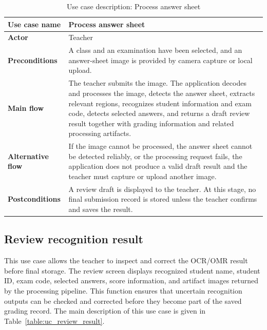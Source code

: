 \documentclass[../Main.tex]{subfiles}
\begin{document}
\begin{table}[H]
    \centering
    \caption{Use case description: Process answer sheet}
    \label{table:uc_process_sheet}
    \renewcommand{\arraystretch}{1.25}
    \begin{tabular}{|p{}|p{}|}
        \hline
        \textbf{Use case name} & Process answer sheet \\
        \hline
        \textbf{Actor} & Teacher \\
        \hline
        \textbf{Preconditions} & A class and an examination have been selected, and an answer-sheet image is provided by camera capture or local upload. \\
        \hline
        \textbf{Main flow} & The teacher submits the image. The application decodes and processes the image, detects the answer sheet, extracts relevant regions, recognizes student information and exam code, detects selected answers, and returns a draft review result together with grading information and related processing artifacts. \\
        \hline
        \textbf{Alternative flow} & If the image cannot be processed, the answer sheet cannot be detected reliably, or the processing request fails, the application does not produce a valid draft result and the teacher must capture or upload another image. \\
        \hline
        \textbf{Postconditions} & A review draft is displayed to the teacher. At this stage, no final submission record is stored unless the teacher confirms and saves the result. \\
        \hline
    \end{tabular}
\end{table}

\subsection{Review recognition result}
\label{subsection:2.3.4}

This use case allows the teacher to inspect and correct the OCR/OMR result before
final storage. The review screen displays recognized student name, student ID,
exam code, selected answers, score information, and artifact images returned by
the processing pipeline. This function ensures that uncertain recognition outputs
can be checked and corrected before they become part of the saved grading
record. The main description of this use case is given in
Table~\ref{table:uc_review_result}.
\end{document}
